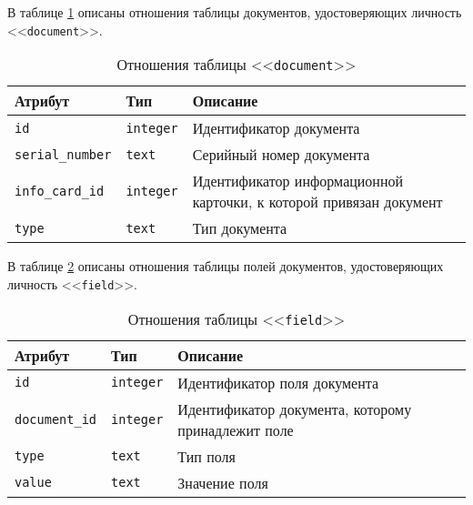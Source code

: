 \clearpage

В таблице \ref{table:documentCols} описаны отношения таблицы документов, удостоверяющих личность <<\texttt{document}>>.
\begin{table}[h!]
	\begin{center}
		\caption{\label{table:documentCols} Отношения таблицы <<\texttt{document}>>}
		\begin{tabularx}{\textwidth}{|X|X|X|}
			\hline
			Атрибут & Тип & Описание \\ \hline
			\texttt{id} & \texttt{integer} & Идентификатор документа \\ \hline
			\texttt{serial\_number} & \texttt{text} & Серийный номер документа \\ \hline
			\texttt{info\_card\_id} & \texttt{integer} & Идентификатор информационной карточки, к которой привязан документ \\ \hline
			\texttt{type} & \texttt{text} & Тип документа \\ \hline
		\end{tabularx}
	\end{center}
\end{table}

В таблице \ref{table:fieldCols} описаны отношения таблицы полей документов, удостоверяющих личность <<\texttt{field}>>.
\begin{table}[h!]
	\begin{center}
		\caption{\label{table:fieldCols} Отношения таблицы <<\texttt{field}>>}
		\begin{tabularx}{\textwidth}{|X|X|X|}
			\hline
			Атрибут & Тип & Описание \\ \hline
			\texttt{id} & \texttt{integer} & Идентификатор поля документа \\ \hline
			\texttt{document\_id} & \texttt{integer} & Идентификатор документа, которому принадлежит поле \\ \hline
			\texttt{type} & \texttt{text} & Тип поля \\ \hline
			\texttt{value} & \texttt{text} & Значение поля \\ \hline
		\end{tabularx}
	\end{center}
\end{table}

\clearpage

